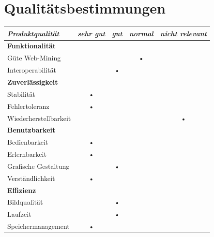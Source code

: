 \documentclass[10pt]{scrreprt}
\begin{document}
\chapter{Qualitätsbestimmungen}
\begin{center}
\begin{tabular}{lcccc}
\hline 
\rule[-1ex]{0pt}{4ex} \textit{Produktqualität} & \textit{sehr gut} & \textit{gut} & \textit{normal} & \textit{nicht relevant} \\ 
\hline 
\rule[-1ex]{0pt}{4ex} \textbf{Funktionalität} &  &  &  &  \\ 
\rule[-1ex]{0pt}{4ex} \hspace{10pt} Güte Web-Mining & &  & • & \\ 
\rule[-1ex]{0pt}{4ex} \hspace{10pt} Interoperabilität & & • & & \\ 

\hline 
\rule[-1ex]{0pt}{4ex} \textbf{Zuverlässigkeit} &  &  &  &  \\ 
\rule[-1ex]{0pt}{4ex} \hspace{10pt} Stabilität & • & & & \\ 
\rule[-1ex]{0pt}{4ex} \hspace{10pt} Fehlertoleranz & • & & & \\ 
\rule[-1ex]{0pt}{4ex} \hspace{10pt} Wiederherstellbarkeit &  &  &  & • \\ 

\hline 
\rule[-1ex]{0pt}{4ex} \textbf{Benutzbarkeit} &  &  &  &  \\ 
\rule[-1ex]{0pt}{4ex} \hspace{10pt} Bedienbarkeit & • & & & \\ 
\rule[-1ex]{0pt}{4ex} \hspace{10pt} Erlernbarkeit & • & & & \\ 
\rule[-1ex]{0pt}{4ex} \hspace{10pt} Grafische Gestaltung & & • & & \\ 
\rule[-1ex]{0pt}{4ex} \hspace{10pt} Verständlichkeit & • & & & \\ 

\hline 
\rule[-1ex]{0pt}{4ex} \textbf{Effizienz} &  &  &  &  \\ 
\rule[-1ex]{0pt}{4ex} \hspace{10pt} Bildqualität & & • & & \\ 
\rule[-1ex]{0pt}{4ex} \hspace{10pt} Laufzeit & & • & & \\ 
\rule[-1ex]{0pt}{4ex} \hspace{10pt} Speichermanagement & • & & & \\ 


\end{tabular}
\end{center}
\end{document}
